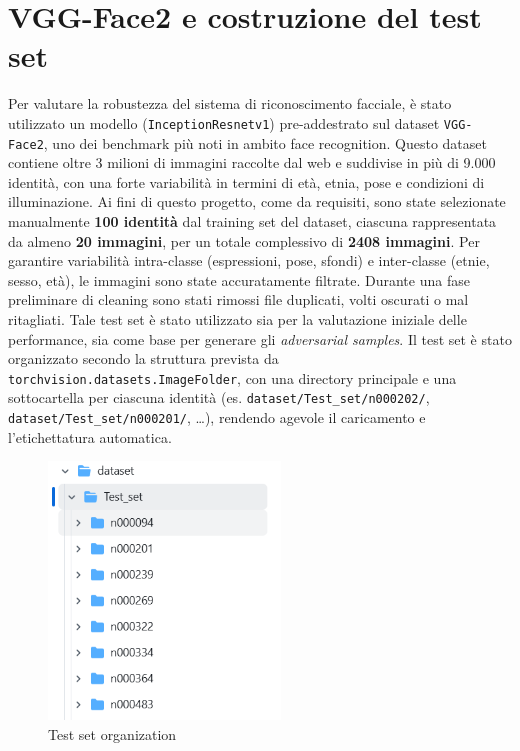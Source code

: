     \section{VGG-Face2 e costruzione del test set}
        Per valutare la robustezza del sistema di riconoscimento facciale, è stato utilizzato un modello (\texttt{InceptionResnetv1}) pre-addestrato sul dataset \texttt{VGG-Face2}, uno dei benchmark più noti in ambito face recognition. Questo dataset contiene oltre 3 milioni di immagini raccolte dal web e suddivise in più di 9.000 identità, con una forte variabilità in termini di età, etnia, pose e condizioni di illuminazione.
        Ai fini di questo progetto, come da requisiti, sono state selezionate manualmente \textbf{100 identità} dal training set del dataset, ciascuna rappresentata da almeno \textbf{20 immagini}, per un totale complessivo di \textbf{2408 immagini}.
        Per garantire variabilità intra-classe (espressioni, pose, sfondi) e inter-classe (etnie, sesso, età), le immagini sono state accuratamente filtrate. Durante una fase preliminare di cleaning sono stati rimossi file duplicati, volti oscurati o mal ritagliati.
        Tale test set è stato utilizzato sia per la valutazione iniziale delle performance, sia come base per generare gli \textit{adversarial samples}.
        Il test set è stato organizzato secondo la struttura prevista da \texttt{torchvision.datasets.ImageFolder}, con una directory principale e una sottocartella per ciascuna identità (es. \texttt{dataset/Test\_set/n000202/}, \texttt{dataset/Test\_set/n000201/}, \ldots), rendendo agevole il caricamento e l’etichettatura automatica.
            \begin{figure}[H]
                \centering
                \includegraphics[width=0.55\textwidth]{images/Test_set.png}
                \caption{Test set organization}
            \end{figure}

